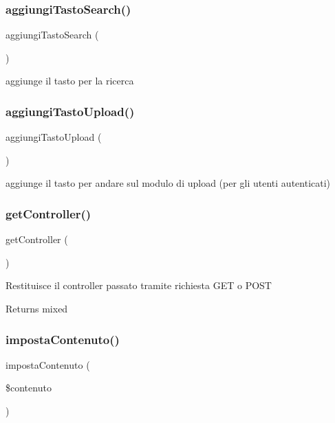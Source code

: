 \subsubsection{\texorpdfstring{aggiungi\+Tasto\+Search()}{aggiungiTastoSearch()}}
{\footnotesize\ttfamily aggiungi\+Tasto\+Search (\begin{DoxyParamCaption}{ }\end{DoxyParamCaption})}

aggiunge il tasto per la ricerca \mbox{\label{class_v_home_ab9f05cc1c0334345d8bf05de0f427a8c}} 
\subsubsection{\texorpdfstring{aggiungi\+Tasto\+Upload()}{aggiungiTastoUpload()}}
{\footnotesize\ttfamily aggiungi\+Tasto\+Upload (\begin{DoxyParamCaption}{ }\end{DoxyParamCaption})}

aggiunge il tasto per andare sul modulo di upload (per gli utenti autenticati) \mbox{\label{class_v_home_aa8b89e0bad51878addc1300cd3e95b5c}} 
\subsubsection{\texorpdfstring{get\+Controller()}{getController()}}
{\footnotesize\ttfamily get\+Controller (\begin{DoxyParamCaption}{ }\end{DoxyParamCaption})}

Restituisce il controller passato tramite richiesta G\+ET o P\+O\+ST

\begin{DoxyReturn}{Returns}
mixed 
\end{DoxyReturn}
\mbox{\label{class_v_home_adc521709c98ca1fed92db3923c3d5b55}} 
\subsubsection{\texorpdfstring{imposta\+Contenuto()}{impostaContenuto()}}
{\footnotesize\ttfamily imposta\+Contenuto (\begin{DoxyParamCaption}\item[{}]{\$contenuto }\end{DoxyParamCaption})}

